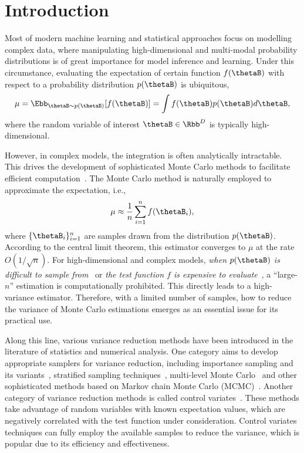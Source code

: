 \documentclass[runningheads]{llncs}
\begin{document}
\section{Introduction}
Most of modern machine learning and statistical approaches focus on modelling complex data, where manipulating high-dimensional and multi-modal probability distributions is of great importance for model inference and learning. Under this circumstance, evaluating the expectation of certain function $f(\thetaB)$ with respect to a probability distribution $p(\thetaB)$ is ubiquitous, 
\begin{equation}
\mu = \Ebb_{\thetaB \sim p(\thetaB)} [f(\thetaB)] = \int f(\thetaB) p(\thetaB) d \thetaB, 
\end{equation}
where the random variable of interest $\thetaB \in \Rbb^D$ is typically high-dimensional. 

However, in complex models, the integration is often analytically intractable. This drives the development of sophisticated Monte Carlo methods to facilitate efficient computation~\cite{robert2004monte}. The Monte Carlo method is naturally employed to approximate the expectation, i.e.,
\begin{equation}
\mu  \approx  \frac{1}{n} \sum_{i=1}^n f(\thetaB_i),
\end{equation}
where $\{\thetaB_i \}_{i=1}^n$ are samples drawn from the distribution $p(\thetaB)$.  According to the central limit theorem, this estimator converges to $\mu$ at the rate $O(1/\sqrt{n})$. For high-dimensional and complex models,  \emph{when $p(\thetaB)$ is difficult to sample from}~\cite{neal2012bayesian}  or \emph{the test function $f$ is expensive to evaluate}~\cite{higdon2015bayesian},  a ``large-$n$'' estimation is  computationally prohibited.  This directly leads to a high-variance estimator. Therefore, with a limited number of samples,  how to reduce the variance of Monte Carlo estimations emerges as an essential issue for its practical use. 

Along this line, various variance reduction methods have been introduced in the literature of statistics and numerical analysis. One category aims to develop appropriate samplers for variance reduction, including importance sampling and its variants~\cite{cornuet2012adaptive}, stratified sampling techniques~\cite{rubinstein2016simulation}, multi-level Monte Carlo~\cite{giles2013multilevel} and other sophisticated methods based on Markov chain Monte Carlo (MCMC)~\cite{robert2004monte}. Another category of variance reduction methods is called control variates~\cite{assaraf1999zero,mira2013zero,oates2016controlled,oates2017control,liu2017action,tucker2017rebar}. These methods take advantage of random variables with known expectation values, which are negatively correlated with the test function under consideration. Control variates techniques  can fully employ the available samples to reduce the variance, which is popular due to its efficiency and effectiveness. 
\end{document}
